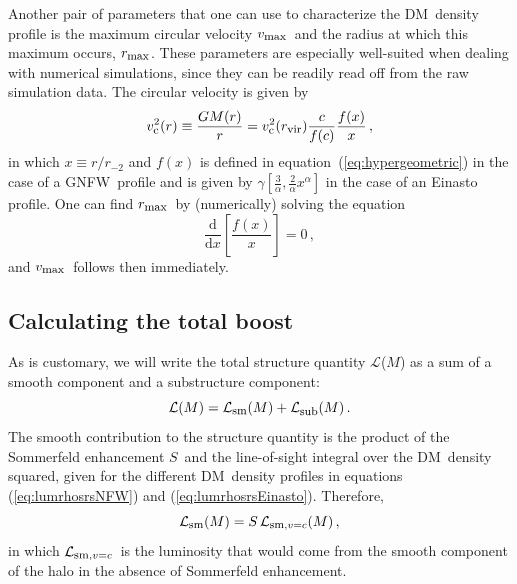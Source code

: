 \documentclass[aps,prd,twocolumn,amsmath,amssymb,floatfix,nofootinbib,10pt]{revtex4}
\newcommand{\NFW}{NFW}
\newcommand{\GNFW}{G\NFW}
\newcommand{\DM}{DM}
\newcommand{\somm}{\ensuremath{S}}
\newcommand{\dd}{\mathrm{d}}
\newcommand{\eqnname}{equation}
\newcommand{\lum}{\ensuremath{\mathcal{L}}}
\newcommand{\lumsmooth}{\ensuremath{\lum_{\mbox{{\footnotesize sm}}}}}
\newcommand{\lumsmoothc}{\ensuremath{\lum_{\mbox{{\footnotesize sm}},v=c}}}
\newcommand{\lumsub}{\ensuremath{\lum_{\mbox{{\footnotesize sub}}}}}
\newcommand{\rminustwo}{\ensuremath{r_{-2}}}
\newcommand{\alphaEinasto}{\ensuremath{\alpha}}
\newcommand{\Rvir}{\ensuremath{r_{\mbox{{\footnotesize vir}}}}}
\newcommand{\vcirc}{\ensuremath{v_{\mbox{{\footnotesize c}}}}}
\newcommand{\vmax}{\ensuremath{v_{\mbox{{\footnotesize max}}}}}
\newcommand{\rmax}{\ensuremath{r_{\mbox{{\footnotesize max}}}}}
\begin{document}
Another pair of parameters that one can use to characterize the \DM\
density profile is the maximum circular velocity \vmax\ and the radius
at which this maximum occurs, \rmax. These parameters are especially
well-suited when dealing with numerical simulations, since they can be
readily read off from the raw simulation data. The circular velocity
is given by
\begin{equation}
\vcirc^2(r) \equiv \frac{G M(r)}{r} = \vcirc^2(\Rvir)\frac{c}{f(c)}\frac{f(x)}{x}\, ,
\end{equation}
in which $x \equiv r/\rminustwo$ and $f(x)$ is defined in \eqnname\
(\ref{eq:hypergeometric}) in the case of a \GNFW\ profile and is given
by
$\gamma\left[\frac{3}{\alphaEinasto},\frac{2}{\alphaEinasto}x^\alphaEinasto\right]$
in the case of an Einasto profile. One can find \rmax\ by
(numerically) solving the equation
\begin{equation}
\frac{\dd}{\dd x}\left[ \frac{f(x)}{x}\right] = 0\, ,
\end{equation}
and \vmax\ follows then immediately.


\subsection{Calculating the total boost}

As is customary, we will write the total structure quantity \lum($M$) as a
sum of a smooth component and a substructure component:
\begin{equation}
\lum(M) = \lumsmooth(M) + \lumsub(M)\, .
\end{equation}
The smooth contribution to the structure quantity is the product of
the Sommerfeld enhancement \somm\ and the line-of-sight integral over
the \DM\ density squared, given for the different \DM\ density
profiles in \eqnname s (\ref{eq:lumrhosrsNFW}) and
(\ref{eq:lumrhosrsEinasto}). Therefore,
\begin{equation}
\lumsmooth(M) = \somm \, \lumsmoothc(M)\, ,
\end{equation}
in which \lumsmoothc\ is the luminosity that would come from the
smooth component of the halo in the absence of Sommerfeld enhancement.
\end{document}

